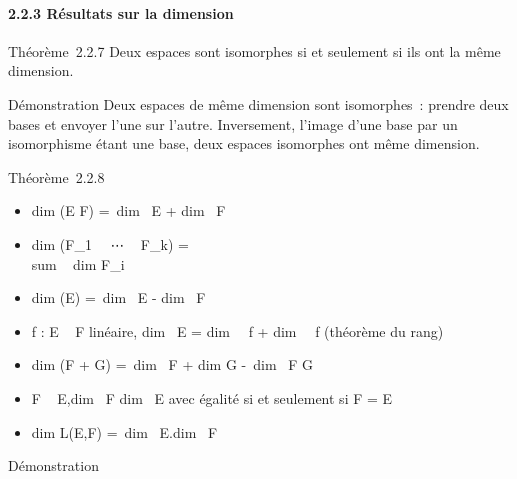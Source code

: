 \documentclass[]{article}
\begin{document}
\paragraph{2.2.3 Résultats sur la dimension}

Théorème~2.2.7 Deux espaces sont isomorphes si et seulement si ils ont
la même dimension.

Démonstration Deux espaces de même dimension sont isomorphes~: prendre
deux bases et envoyer l'une sur l'autre. Inversement, l'image d'une base
par un isomorphisme étant une base, deux espaces isomorphes ont même
dimension.

Théorème~2.2.8

\begin{itemize}
\itemsep1pt\parskip0pt
\item
  dim (E \times F) =\ dim~
  E + dim~ F
\item
  dim (F_1~
  \oplus~⋯ \oplus~ F_k)
  = \\sum ~
  dim F_i~
\item
   dim (E\diagupF) =\ dim~ E
  - dim~ F
\item
  f : E \rightarrow~ F linéaire, dim~ E
  = dim~
  \mathrmKer~f
  + dim~
  \mathrmIm~f (théorème du
  rang)
\item
  dim (F + G) =\ dim~
  F + dim G -\ dim~ F
  \bigcap G
\item
  F \subset~ E,\quad dim~ F
  \leq dim~ E avec égalité si et seulement si F =
  E
\item
  dim L(E,F) =\ dim~
  E.dim~ F
\end{itemize}

Démonstration
\end{document}
